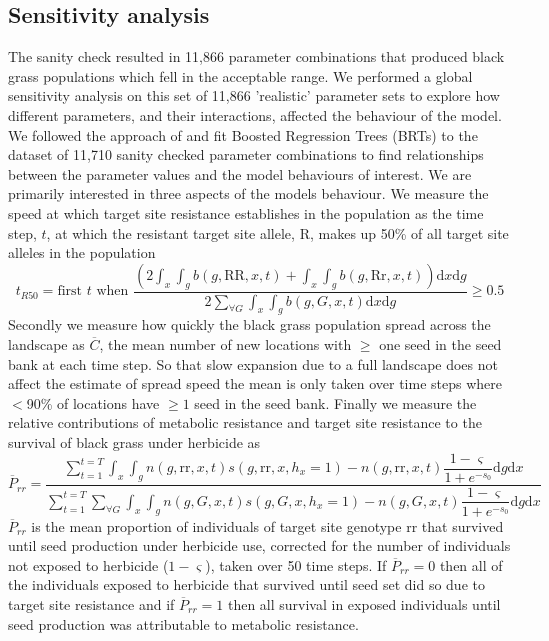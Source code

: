 \documentclass[12pt, a4paper]{article}
\begin{document}
\subsection{Sensitivity analysis}
The sanity check resulted in 11,866 parameter combinations that produced black grass populations which fell in the acceptable range. We performed a global sensitivity analysis on this set of 11,866 'realistic' parameter sets to explore how different parameters, and their interactions, affected the behaviour of the model. We followed the approach of \cite{Cout2014} and fit Boosted Regression Trees (BRTs) to the dataset of 11,710 sanity checked parameter combinations to find relationships between the parameter values and the model behaviours of interest. We are primarily interested in three aspects of the models behaviour. We measure the speed at which target site resistance establishes in the population as the time step, $t$, at which the resistant target site allele, R, makes up 50\% of all target site alleles in the population  
\begin{equation}\label{eq:t_R50}
	t_{R50} = \text{first } t \text{ when } \frac{\left(2\int_x\int_g b(g, \text{RR}, x, t) + \int_x\int_g b(g, \text{Rr}, x, t) \right)\text{d}x\text{d}g}{2\sum_{\forall G} \int_x\int_g b(g, G, x, t)\text{d}x\text{d}g} \geq 0.5
\end{equation}
Secondly we measure how quickly the black grass population spread across the landscape as $\overline{C}$, the mean number of new locations with $\geq$ one seed in the seed bank at each time step. So that slow expansion due to a full landscape does not affect the estimate of spread speed the mean is only taken over time steps where $<$90\% of locations have $\geq 1$ seed in the seed bank. Finally we measure the relative contributions of metabolic resistance and target site resistance to the survival of black grass under herbicide as   
\begin{equation}\label{eq:mean_pro_rr}
	\overline{P}_{rr} = \frac{\sum_{t=1}^{t=T}\int_x\int_g n(g, \text{rr}, x, t)s(g, \text{rr}, x, h_x = 1) - n(g, \text{rr}, x, t)\dfrac{1 - \varsigma}{1 + e^{-s_0}}\text{d}g\text{d}x}{\sum_{t=1}^{t=T}\sum_{\forall G}\int_x\int_g n(g, G, x, t)s(g, G, x, h_x = 1) - n(g, G, x, t)\dfrac{1 - \varsigma}{1 + e^{-s_0}}\text{d}g\text{d}x}
\end{equation} 
$\overline{P}_{rr}$ is the mean proportion of individuals of target site genotype rr that survived until seed production under herbicide use, corrected for the number of individuals not exposed to herbicide ($1 - \varsigma$), taken over 50 time steps. If $\overline{P}_{rr} = 0$ then all of the individuals exposed to herbicide that survived until seed set did so due to target site resistance and if $\overline{P}_{rr} = 1$ then all survival in exposed individuals until seed production was attributable to metabolic resistance.   
\end{document}
